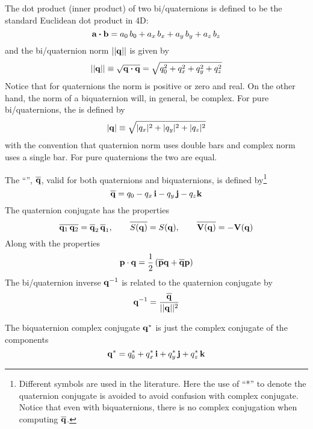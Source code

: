 The dot product (inner product) of two bi/quaternions is defined to be the
standard Euclidean dot product in 4D:
\begin{equation}
  {\bf a} \mathbin{\boldsymbol{\cdot}} {\bf b} = a_0 \, b_0 + a_x \, b_x + a_y \, b_y + a_z \, b_z
\end{equation}
and the bi/quaternion norm $||{\bf q}||$ is given by
\begin{equation}
  ||{\bf q}|| \equiv \sqrt{{\bf q} \mathbin{\boldsymbol{\cdot}} {\bf q}} = \sqrt{q_0^2 + q_x^2 + q_y^2 + q_z^2}
  \label{1qqq}
\end{equation}
Notice that for quaternions the norm is positive or zero and real. On the other hand, the norm of a
biquaternion will, in general, be complex. For pure bi/quaternions, the 
is defined by 
\begin{equation}
  |{\bf q}| \equiv \sqrt{|q_x|^2 + |q_y|^2 + |q_z|^2}
\end{equation}
with the convention that quaternion norm uses double bars and complex norm uses a single bar. For
pure quaternions the two are equal.

The ``'', $\BAR\bfq$, valid for both quaternions and biquaternions, is defined
by\footnote
  {
Different symbols are used in the literature. Here the use of ``*'' to denote the quaternion
conjugate is avoided to avoid confusion with complex conjugate.  Notice that even with
biquaternions, there is no complex conjugation when computing $\BAR\bfq$.
  }
\begin{equation}
  \BAR\bfq = q_0 - q_x \, \cali - q_y \, \calj - q_z \calk
\end{equation}
The quaternion conjugate has the properties
\begin{equation}
  \BAR{\bfq_1 \, \bfq_2} = \BAR\bfq_2 \, \BAR\bfq_1, \qquad 
  \BAR{S(\bfq)} = S(\bfq), \qquad 
  \BAR{\bfV(\bfq)} = -\bfV(\bfq)
\end{equation}
Along with the properties
\begin{equation}
  \bfp \cdot \bfq = \frac{1}{2} \, (\BAR\bfp \bfq + \BAR\bfq \bfp)
\end{equation}
The bi/quaternion inverse ${\bf q}^{-1}$ is related to the quaternion conjugate by
\begin{equation}
  \bfq^{-1} = \frac{\BAR\bfq}{||\bfq||^2}
\end{equation}

The biquaternion complex conjugate ${\bf q}^*$ is just the complex conjugate of the components
\begin{equation}
  {\bf q}^* = q_0^* + q_x^* \, {\bf i} + q_y^* \, {\bf j} + q_z^* \, {\bf k} 
\end{equation}

